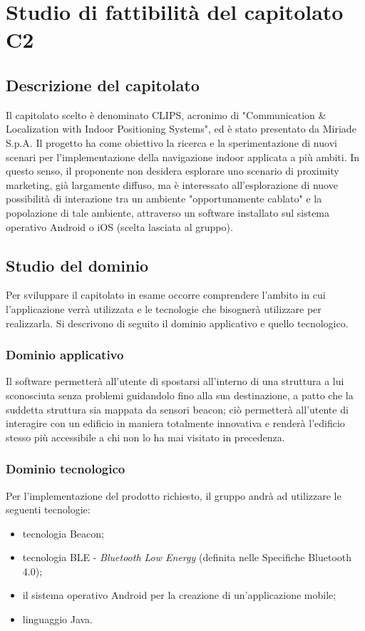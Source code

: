 \documentclass[../nStudioDiFattibilita.tex]{subfiles}
\begin{document}
\section{Studio di fattibilità del capitolato C2}
	\subsection{Descrizione del capitolato}
	Il capitolato scelto è denominato CLIPS, acronimo di "Communication \& Localization with Indoor Positioning Systems", ed è stato presentato da Miriade S.p.A.
	Il progetto ha come obiettivo la ricerca e la sperimentazione di nuovi scenari per l'implementazione della navigazione indoor applicata a più ambiti.
	In questo senso, il proponente non desidera esplorare uno scenario di proximity marketing, già largamente diffuso, ma è interessato all'esplorazione di nuove possibilità di interazione tra un ambiente "opportunamente cablato" e la popolazione di tale ambiente, attraverso un software installato sul sistema operativo Android o iOS (scelta lasciata al gruppo).
	\subsection{Studio del dominio}
	Per sviluppare il capitolato in esame occorre comprendere l'ambito in cui l'applicazione verrà utilizzata e le tecnologie che bisognerà utilizzare per realizzarla. Si descrivono di seguito il dominio applicativo e quello tecnologico.
		\subsubsection{Dominio applicativo}
		Il software permetterà all'utente di spostarsi all'interno di una struttura a lui sconosciuta senza problemi guidandolo fino alla sua destinazione, a patto che la suddetta struttura sia mappata da sensori beacon; ciò permetterà all'utente di interagire con un edificio in maniera totalmente innovativa e renderà l'edificio stesso più accessibile a chi non lo ha mai visitato in precedenza.
		\subsubsection{Dominio tecnologico}
		Per l'implementazione del prodotto richiesto, il gruppo andrà ad utilizzare le seguenti tecnologie:
			\begin{itemize}
				\item tecnologia Beacon;
				\item tecnologia BLE - \textit{Bluetooth Low Energy} (definita nelle Specifiche Bluetooth 4.0);
				\item il sistema operativo Android per la creazione di un'applicazione mobile;
				\item linguaggio Java.
			\end{itemize}
\end{document}
